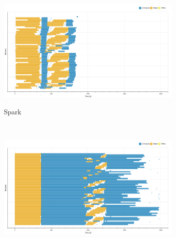 \documentclass[conference]{IEEEtran}
\begin{document}

\begin{figure}[!b]
    \centering
    \begin{subfigure}[b]{\columnwidth}
        \href{https://mathdugre.github.io/paper-big-data-engines/spark-histo-baseline.html}{
        \includegraphics[clip,width=\columnwidth,
        height=0.15\textheight]{images/spark_histo_gantt.png}}
        \caption{Spark}\label{fig:histo_spark_gantt}
    \end{subfigure}
    \\
    \begin{subfigure}[b]{\columnwidth}
        \href{https://mathdugre.github.io/paper-big-data-engines/dask-bag-histo-baseline.html}{
        \includegraphics[clip,width=\columnwidth,
        height=0.15\textheight]{images/bag_histo_gantt.png}}

\end{subfigure}
\end{figure}
\end{document}
